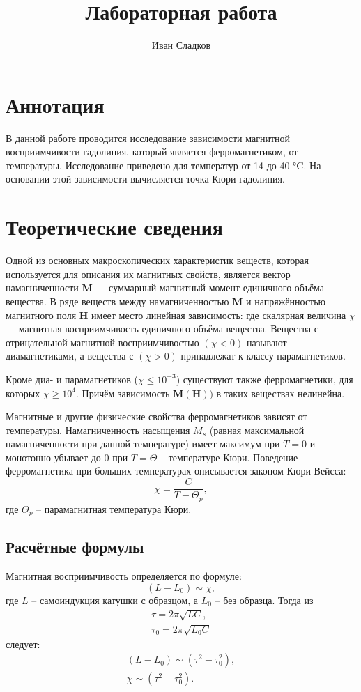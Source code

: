 \documentclass[a4paper]{article}
\title{Лабораторная работа \labnum \space \labname} %
\author{Иван Сладков}
\begin{document}
\maketitle
\thispagestyle{empty}
\section{Аннотация}
В данной работе проводится исследование зависимости магнитной восприимчивости гадолиния, который является ферромагнетиком, от температуры. Исследование приведено для температур от 14 до 40 \si{\degreeCelsius}. На основании этой зависимости вычисляется точка Кюри гадолиния.
\section{Теоретические сведения}
Одной из основных макроскопических характеристик веществ, которая используется для описания их магнитных свойств, является вектор намагниченности $\mathbf{M}$ — суммарный магнитный момент единичного
объёма вещества. В ряде веществ между намагниченностью $\mathbf{M}$ и напряжённостью магнитного поля $\mathbf{H}$ имеет место линейная зависимость:
где скалярная величина $\chi$ — магнитная восприимчивость единичного
объёма вещества. Вещества с отрицательной магнитной восприимчивостью $(\chi < 0)$ называют диамагнетиками, а вещества с $(\chi >0)$ принадлежат к классу парамагнетиков.

Кроме диа- и парамагнетиков ($\chi \le 10^{-3}$) существуют также ферромагнетики, для которых $\chi \ge 10^{4}$. Причём зависимость $\mathbf{M(H))}$ в таких веществах нелинейна. 

Магнитные и другие физические свойства ферромагнетиков зависят от температуры. Намагниченность насыщения $M_s$ (равная максимальной намагниченности при данной температуре) имеет максимум при $T=0$ и монотонно убывает до $0$ при $T=\Theta$ -- температуре Кюри. Поведение ферромагнетика при больших температурах описывается законом Кюри-Вейсса:
\begin{equation}
	\chi = \frac{C}{T-\Theta_p},
	\label{a}
\end{equation}
где $\Theta_p$ -- парамагнитная температура Кюри.
\subsection{Расчётные формулы}
Магнитная восприимчивость определяется по формуле:
\begin{equation}
	(L-L_0)\sim \chi,
\end{equation}
где $L$ -- самоиндукция катушки с образцом, а $L_0$ -- без образца. Тогда из 
\begin{align}
	\tau = 2 \pi \sqrt{L C}, \\
	\tau_0 = 2 \pi \sqrt{L_0 C}
\end{align}
следует:
\begin{align}
	(L-L_0)\sim (\tau^2 - \tau_0^2), \\
	\chi \sim (\tau^2 - \tau_0^2).
	\label{b}
\end{align}
\end{document}
